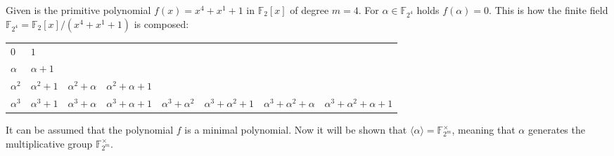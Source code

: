 Given is the primitive polynomial $f(x)=x^4+x^1+1$ in $\mathbb{F}_2[x]$ of degree $m=4$. For $\alpha \in \mathbb{F}_{2^4}$ holds $f(\alpha)=0$. This is how the finite field $\mathbb{F}_{2^4}=\mathbb{F}_2[x]/(x^4+x^1+1)$ is composed:
\vspace{-0.5 cm}
\begin{center}
	\begin{tabular}{l l l l l l l l}
		   	$0$	& 	$1$ \\
			$\alpha$	&	$\alpha+1$ \\
			$\alpha^2$	&	$\alpha^2+1$	&	$\alpha^2+\alpha$	&	$\alpha^2+\alpha+1$ \\ 
			$\alpha^3$	&	$\alpha^3+1$	&	$\alpha^3+\alpha$	&	$\alpha^3+\alpha+1$	&	$\alpha^3+\alpha^2$ 	&	$\alpha^3+\alpha^2+1$	&
			$\alpha^3+\alpha^2+\alpha$	& $\alpha^3+\alpha^2+\alpha+1$
	\end{tabular}
\end{center}
It can be assumed that the polynomial $f$ is a minimal polynomial. Now it will be shown that $\langle\alpha\rangle=\mathbb{F}_{2^m}^\times$, meaning that $\alpha$ generates the multiplicative group $\mathbb{F}_{2^m}^\times$.
